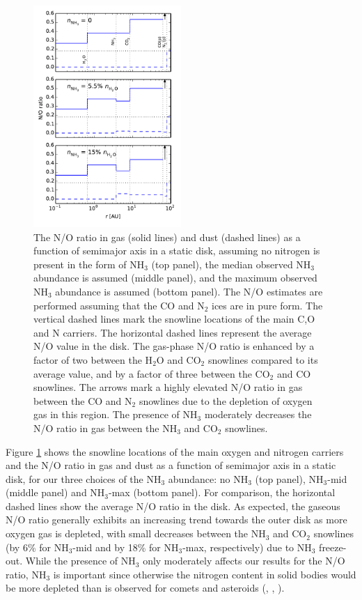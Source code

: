 \documentclass[apj]{emulateapj}
\begin{document}
\begin{figure}[h!]
\centering
\includegraphics[width=0.5\textwidth]{N_O_ratio.pdf}
\caption{The N/O ratio in gas (solid lines) and dust (dashed lines) as a function of semimajor axis in a static disk, assuming no nitrogen is present in the form of NH$_3$ (top panel), the median observed NH$_3$ abundance is assumed (middle panel), and the maximum observed NH$_3$ abundance is assumed (bottom panel). The N/O estimates are performed assuming that the CO and N$_2$ ices are in pure form. The vertical dashed lines mark the snowline locations of the main C,O and N carriers. The horizontal dashed lines represent the average N/O value in the disk. The gas-phase N/O ratio is enhanced by a factor of two between the H$_2$O and CO$_2$ snowlines compared to its average value, and by a factor of three between the CO$_2$ and CO snowlines. The arrows mark a highly elevated N/O ratio in gas between the CO and N$_2$ snowlines due to the depletion of oxygen gas in this region. The presence of NH$_3$ moderately decreases the N/O ratio in gas between the NH$_3$ and CO$_2$ snowlines.} 
\label{fig:Nstatic}
\end{figure}

Figure \ref{fig:Nstatic} shows the snowline locations of the main oxygen and nitrogen carriers and the N/O ratio in gas and dust as a function of semimajor axis in a static disk, for our three choices of the NH$_3$ abundance: no NH$_3$ (top panel), NH$_3$-mid (middle panel) and NH$_3$-max (bottom panel). For comparison, the horizontal dashed lines show the average N/O ratio in the disk. As expected, the gaseous N/O ratio generally exhibits an increasing trend towards the outer disk as more oxygen gas is depleted, with small decreases between the NH$_3$ and CO$_2$ snowlines (by 6\% for NH$_3$-mid and by 18\% for NH$_3$-max, respectively) due to NH$_3$ freeze-out. While the presence of NH$_3$ only moderately affects our results for the N/O ratio, NH$_3$ is important since otherwise the nitrogen content in solid bodies would be more depleted than is observed for comets and asteroids (\citealt{wyckoff91}, \citealt{mumma11}, \citealt{bergin15}).
\end{document}
